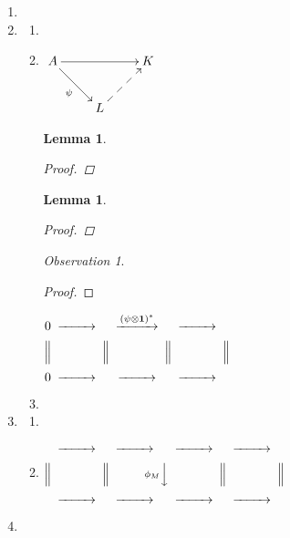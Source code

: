 \documentclass{amsart}
\numberwithin{equation}{section}
\theoremstyle{plain}
\newtheorem{lemma}[theorem]{Lemma}
\theoremstyle{definition}
\theoremstyle{remark}
\newtheorem{observation}[theorem]{Observation}
\renewcommand{\_}[2]{\underbrace{#1}_{#2}}
\renewcommand{\^}[2]{\overbrace{#1}_{#2}}
\begin{document}
\begin{enumerate}
\item 
\item
\begin{enumerate}
\item 
\item 
$
\xymatrix{
A \ar[rr] \ar[dr]_\psi & & K\\
& L \ar@{-->}[ur]
}
$
\begin{lemma}

\begin{proof}

\end{proof}
\end{lemma}
\begin{lemma}{}
\begin{proof}
\Lightning
\end{proof}
\end{lemma}

\begin{observation}

\begin{proof}

\end{proof}
\end{observation}

$\begin{CD}
0 @>>>  @>\left(\psi \otimes \mathbf{1} \right)^*>>   @>>> \\
@| @| @| @|\\
0@>>> @>>>  @>>> 
\end{CD}$ 
 

\item{}







\end{enumerate}

\item 
\begin{enumerate}
\item

\item

$\begin{CD}  @>>>  @>>>  @>>>  @>>> \\
@|@|@V \phi_M VV @|@| \\
@>>>  @>>>  @>>>  @>>>  
\end{CD}$
 
\end{enumerate}

\item 


\end{enumerate}
\end{document}
